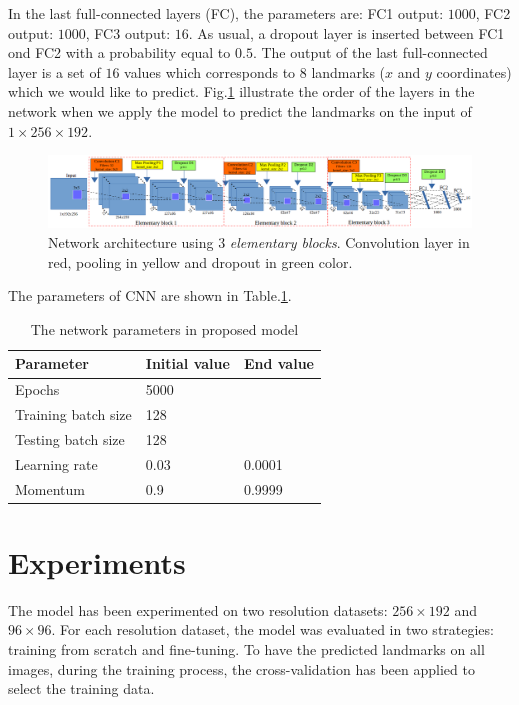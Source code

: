 \documentclass[12pt,a4paper]{article}
\begin{document}
In the last full-connected layers (FC), the parameters are: FC1
output: $1000$, FC2 output: $1000$, FC3 output: $16$. As usual, a
dropout layer is inserted between FC1 ond FC2 with a probability equal to $0.5$. The output of the last full-connected layer is a set of $16$ values which corresponds to 8 landmarks ($x$ and $y$ coordinates) which we would like to predict. Fig.\ref{cnnnetwork2} illustrate the order of the layers in the network when we apply the model to predict the landmarks on the input of $1 \times 256 \times 192$.

\begin{figure}[h]
\centering
\includegraphics[scale=0.3]{images/cnn_newdatasize/arch_model}
\caption{{\small{Network architecture using $3$ \textit{elementary blocks}.
  Convolution
  layer in red, pooling in yellow and dropout in green color.}}} 
\label{cnnnetwork2}
\end{figure}

The parameters of CNN are shown in Table.\ref{model2parameters}.
\begin{table}[h!]
	\centering
	\begin{tabular}{l l l}
	Parameter & Initial value & End value \\ \hline
	Epochs & 5000 &  \\ \hline
	Training batch size & 128 & \\ \hline
	Testing batch size & 128 & \\ \hline
	Learning rate & 0.03 & 0.0001 \\ \hline
	Momentum & 0.9 & 0.9999 \\ \hline
	\end{tabular}
	\caption{The network parameters in proposed model}
	\label{model2parameters}
\end{table}
\section{Experiments}
\label{secexpr}
The model has been experimented on two resolution datasets: $256 \times 192$ and $96 \times 96$. For each resolution dataset, the model was evaluated in two strategies: training from scratch and fine-tuning. To have the predicted landmarks on all images, during the training process, the cross-validation has been applied to select the training data.
\end{document}

